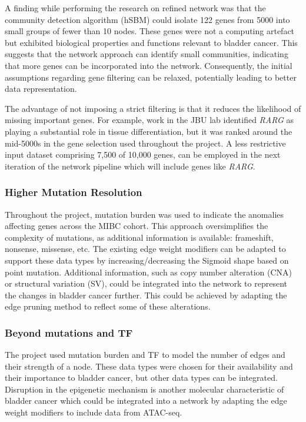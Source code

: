 A finding while performing the research on refined network was that the community detection algorithm (hSBM) could isolate 122 genes from 5000 into small groups of fewer than 10 nodes. These genes were not a computing artefact but exhibited biological properties and functions relevant to bladder cancer. This suggests that the network approach can identify small communities, indicating that more genes can be incorporated into the network. Consequently, the initial assumptions regarding gene filtering can be relaxed, potentially leading to better data representation.

The advantage of not imposing a strict filtering is that it reduces the likelihood of missing important genes. For example, work in the JBU lab identified \textit{RARG} as playing a substantial role in tissue differentiation, but it was ranked around the mid-5000s in the gene selection used throughout the project. A less restrictive input dataset comprising 7,500 of 10,000 genes, can be employed in the next iteration of the network pipeline which will include genes like \textit{RARG}.

\subsubsection*{Higher Mutation Resolution}

Throughout the project, mutation burden was used to indicate the anomalies affecting genes across the MIBC cohort. This approach oversimplifies the complexity of mutations, as additional information is available: frameshift, nonsense, missense, etc. The existing edge weight modifiers can be adapted to support these data types by increasing/decreasing the Sigmoid shape based on point mutation. Additional information, such as copy number alteration (CNA) or structural variation (SV), could be integrated into the network to represent the changes in bladder cancer further. This could be achieved by adapting the edge pruning method to reflect some of these alterations.

\subsubsection*{Beyond mutations and TF}

The project used mutation burden and TF to model the number of edges and their strength of a node. These data types were chosen for their availability and their importance to bladder cancer, but other data types can be integrated. Disruption in the epigenetic mechanism is another molecular characteristic of bladder cancer \citep{Robertson2017-mg,Tcga2014-dr} which could be integrated into a network by adapting the edge weight modifiers to include data from ATAC-seq.


